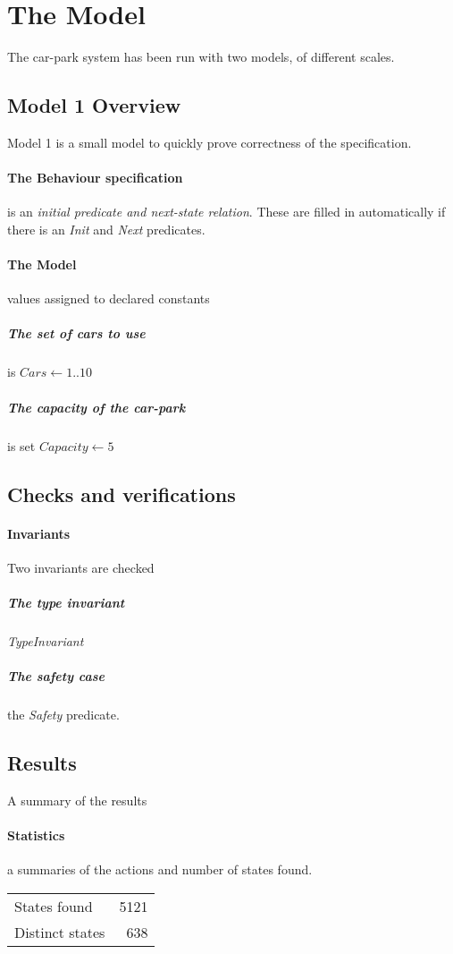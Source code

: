 \documentclass[12pt]{article}
\begin{document}
\section{The Model}
The car-park system has been run with two models, of different scales.

\subsection{Model 1 Overview}
Model 1 is a small model to quickly prove correctness of the specification.
\paragraph{The Behaviour specification} is an \emph{initial
predicate and next-state relation}.  These are filled in automatically if
there is an \textit{Init} and \textit{Next} predicates. 
\paragraph{The Model} values assigned to declared constants
\subparagraph{The set of cars to use} is $\mathit{Cars}\leftarrow 1..10$
\subparagraph{The capacity of the car-park} is set
$\mathit{Capacity}\leftarrow 5$
\subsection{Checks and verifications}
\paragraph{Invariants} Two invariants are checked
\subparagraph{The type invariant} \textit{TypeInvariant} 
\subparagraph{The safety case} the \textit{Safety} predicate.

\subsection{Results} A summary of the results
\paragraph{Statistics} a summaries of the actions and number of states
found.

\begin{table}[h]
\begin{tabular}{lr}
	States found & \num{5121} \\
 Distinct states & \num{638} \\ 
\end{tabular}
\end{table}
\end{document}
